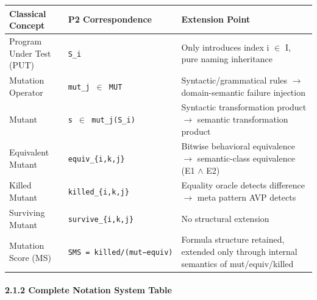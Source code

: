 \documentclass[review,12pt,authoryear]{elsarticle}
\begin{document}
{\def\LTcaptype{none} %
\begin{longtable}[]{@{}
  >{\raggedright\arraybackslash}p{}
  >{\raggedright\arraybackslash}p{}
  >{\raggedright\arraybackslash}p{}@{}}
\toprule\noalign{}
\begin{minipage}[b]{\linewidth}\raggedright
Classical Concept
\end{minipage} & \begin{minipage}[b]{\linewidth}\raggedright
P2 Correspondence
\end{minipage} & \begin{minipage}[b]{\linewidth}\raggedright
Extension Point
\end{minipage} \\
\midrule\noalign{}
\endhead
\bottomrule\noalign{}
\endlastfoot
Program Under Test (PUT) & \texttt{S\_i} & Only introduces index i $\in$ I,
pure naming inheritance \\
Mutation Operator & \texttt{mut\_j\ $\in$\ MUT} & Syntactic/grammatical
rules $\to$ domain-semantic failure injection \\
Mutant & \texttt{s\textquotesingle{}\ $\in$\ mut\_j(S\_i)} & Syntactic
transformation product $\to$ semantic transformation product \\
Equivalent Mutant & \texttt{equiv\_\{i,k,j\}} & Bitwise behavioral
equivalence $\to$ semantic-class equivalence (E1 $\wedge$ E2) \\
Killed Mutant & \texttt{killed\_\{i,k,j\}} & Equality oracle detects
difference $\to$ meta pattern AVP detects \\
Surviving Mutant & \texttt{survive\_\{i,k,j\}} & No structural
extension \\
Mutation Score (MS) & \texttt{SMS\ =\ killed/(mut−equiv)} & Formula
structure retained, extended only through internal semantics of
mut/equiv/killed \\
\end{longtable}
}

\paragraph{2.1.2 Complete Notation System
Table}\label{complete-notation-system-table}
\end{document}
